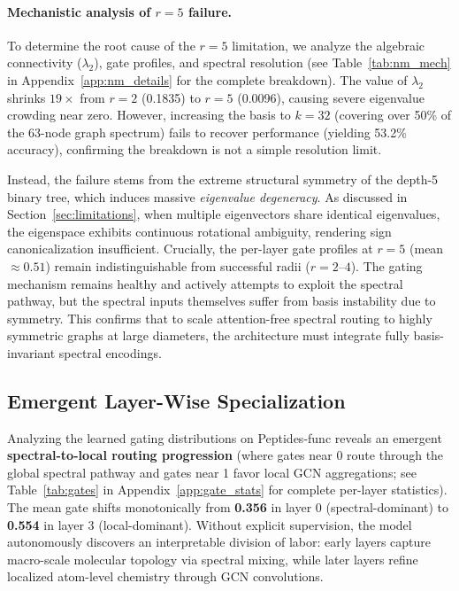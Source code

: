 \documentclass[10pt]{article}
\begin{document}
\paragraph{Mechanistic analysis of $r{=}5$ failure.}
To determine the root cause of the $r{=}5$ limitation, we analyze the algebraic connectivity ($\lambda_2$), gate profiles, and spectral resolution (see Table~\ref{tab:nm_mech} in Appendix~\ref{app:nm_details} for the complete breakdown). The value of $\lambda_2$ shrinks $19\times$ from $r{=}2$ (0.1835) to $r{=}5$ (0.0096), causing severe eigenvalue crowding near zero. However, increasing the basis to $k{=}32$ (covering over 50\% of the 63-node graph spectrum) fails to recover performance (yielding 53.2\% accuracy), confirming the breakdown is not a simple resolution limit.

Instead, the failure stems from the extreme structural symmetry of the depth-5 binary tree, which induces massive \textit{eigenvalue degeneracy}. As discussed in Section~\ref{sec:limitations}, when multiple eigenvectors share identical eigenvalues, the eigenspace exhibits continuous rotational ambiguity, rendering sign canonicalization insufficient. Crucially, the per-layer gate profiles at $r{=}5$ (mean $\approx 0.51$) remain indistinguishable from successful radii ($r{=}2$--$4$). The gating mechanism remains healthy and actively attempts to exploit the spectral pathway, but the spectral inputs themselves suffer from basis instability due to symmetry. This confirms that to scale attention-free spectral routing to highly symmetric graphs at large diameters, the architecture must integrate fully basis-invariant spectral encodings.

\subsection{Emergent Layer-Wise Specialization}
\label{sec:gate_analysis}

Analyzing the learned gating distributions on Peptides-func reveals an emergent \textbf{spectral-to-local routing progression} (where gates near 0 route through the global spectral pathway and gates near 1 favor local GCN aggregations; see Table~\ref{tab:gates} in Appendix~\ref{app:gate_stats} for complete per-layer statistics). The mean gate shifts monotonically from \textbf{0.356} in layer 0 (spectral-dominant) to \textbf{0.554} in layer 3 (local-dominant). Without explicit supervision, the model autonomously discovers an interpretable division of labor: early layers capture macro-scale molecular topology via spectral mixing, while later layers refine localized atom-level chemistry through GCN convolutions.
\end{document}
